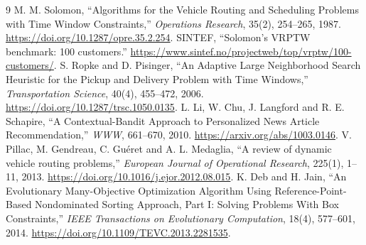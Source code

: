 \documentclass[11pt,a4paper]{article}
\begin{document}
\clearpage
\begin{thebibliography}{9}
 M. M. Solomon, ``Algorithms for the Vehicle Routing and Scheduling Problems with Time Window Constraints,'' \emph{Operations Research}, 35(2), 254--265, 1987. \url{https://doi.org/10.1287/opre.35.2.254}.
 SINTEF, ``Solomon's VRPTW benchmark: 100 customers.'' \url{https://www.sintef.no/projectweb/top/vrptw/100-customers/}.
 S. Ropke and D. Pisinger, ``An Adaptive Large Neighborhood Search Heuristic for the Pickup and Delivery Problem with Time Windows,'' \emph{Transportation Science}, 40(4), 455--472, 2006. \url{https://doi.org/10.1287/trsc.1050.0135}.
 L. Li, W. Chu, J. Langford and R. E. Schapire, ``A Contextual-Bandit Approach to Personalized News Article Recommendation,'' \emph{WWW}, 661--670, 2010. \url{https://arxiv.org/abs/1003.0146}.
 V. Pillac, M. Gendreau, C. Guéret and A. L. Medaglia, ``A review of dynamic vehicle routing problems,'' \emph{European Journal of Operational Research}, 225(1), 1--11, 2013. \url{https://doi.org/10.1016/j.ejor.2012.08.015}.
 K. Deb and H. Jain, ``An Evolutionary Many-Objective Optimization Algorithm Using Reference-Point-Based Nondominated Sorting Approach, Part I: Solving Problems With Box Constraints,'' \emph{IEEE Transactions on Evolutionary Computation}, 18(4), 577--601, 2014. \url{https://doi.org/10.1109/TEVC.2013.2281535}.
\end{thebibliography}
\end{document}
